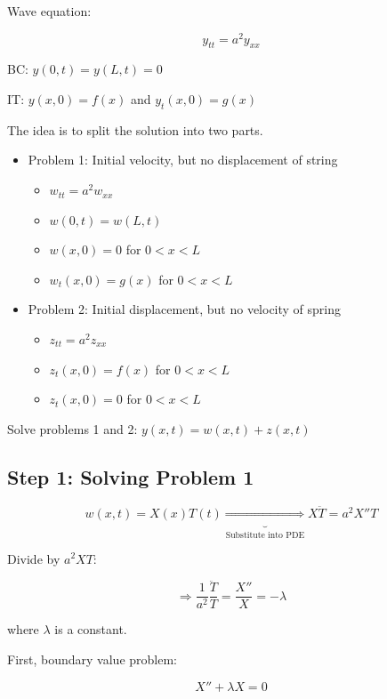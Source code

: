\hline

\hfill

Wave equation: 

$$y_{tt} = a^2 y_{xx}$$

\begin{center}
    BC: $y(0,t) = y(L,t) = 0$
    
    IT: $y(x,0) = f(x)$ and $y_t(x,0) = g(x)$
\end{center}



The idea is to split the solution into two parts. 


\begin{itemize}
    \item Problem 1: Initial velocity, but no displacement of string
    \begin{itemize}
        \item $w_{tt} = a^2 w_{xx}$
        \item $w(0,t) = w(L,t)$
        \item $w(x,0) = 0$ for $0 < x < L$
        \item $w_t(x,0) = g(x)$ for $0 < x < L$
    \end{itemize}
    \item Problem 2: Initial displacement, but no velocity of spring
    \begin{itemize}
        \item $z_{tt} = a^2 z_{xx}$
        \item $z_t (x,0) = f(x)$ for $0 < x < L$
        \item $z_t(x,0) = 0$ for $0 < x < L$
    \end{itemize}
\end{itemize}

Solve problems 1 and 2: $y(x,t) = w(x,t) + z(x,t)$

\subsection{Step 1: Solving Problem 1}

$$w(x,t) = X(x) T(t) \underbrace{\Rightarrow}_{\text{Substitute into PDE}} X \ddot{T} = a^2 X'' T$$

Divide by $a^2 X T$:

$$\Rightarrow \frac{1}{a^2} \frac{\ddot T}{T} = \frac{X''}{X} = - \lambda$$

where $\lambda$ is a constant. 

First, boundary value problem:

$$X'' + \lambda X = 0$$

